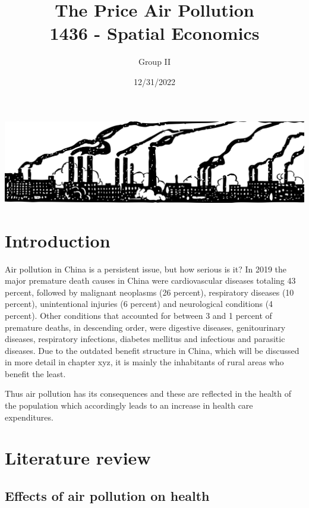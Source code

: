 \documentclass[
]{article}
\title{The Price Air Pollution\\
1436 - Spatial Economics}
\author{Group II}
\date{12/31/2022}
\begin{document}
\maketitle

\begin{center}
\includegraphics[width = 380pt]{pollution.png} 
\end{center}
\thispagestyle{empty}
\newpage
{}

\hypertarget{introduction}{%
\section{Introduction}\label{introduction}}
Air pollution in China is a persistent issue, but how serious is it? 
In 2019 the major premature death causes in China were cardiovascular diseases totaling 43 percent, followed by malignant neoplasms (26 percent), respiratory diseases (10 percent), unintentional injuries (6 percent) and neurological conditions (4 percent). Other conditions that accounted for between 3 and 1 percent of premature deaths, in descending order, were digestive diseases, genitourinary diseases, respiratory infections, diabetes mellitus and infectious and parasitic diseases. %
Due to the outdated benefit structure in China, which will be discussed in more detail in chapter xyz, it is mainly the inhabitants of rural areas who benefit the least. 

Thus air pollution has its consequences and these are reflected in the health of the population which accordingly leads to an increase in health care  expenditures. 







\hypertarget{literature review}{%
\section{Literature review}\label{Literature review}}

\subsection{Effects of air pollution on health}
\end{document}
